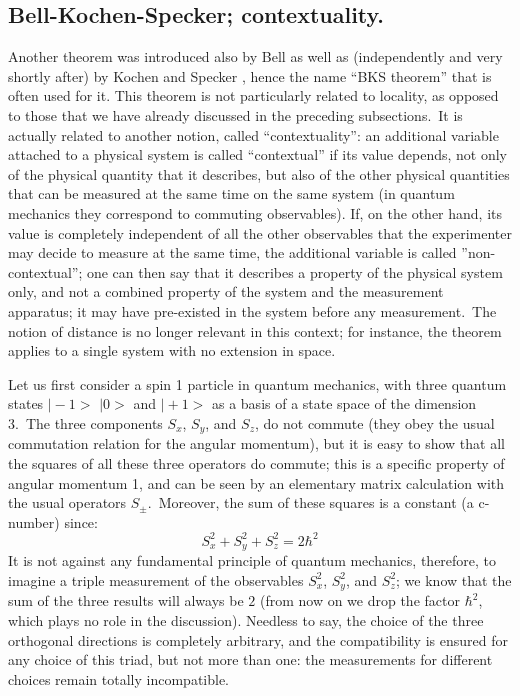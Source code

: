 \documentclass[12pt,onecolumn]{article}%
\begin{document}
\subsection{Bell-Kochen-Specker; contextuality.}

\label{BKS}

Another theorem was introduced also by Bell \cite{Bell-1} as well as
(independently and very shortly after) by Kochen and Specker
\cite{Kochen-Specker}, hence the name ``BKS theorem'' that is often used for
it. This theorem is not particularly related to locality, as opposed to those
that we have already discussed in the preceding subsections.\ It is actually
related to another notion, called ``contextuality'': an additional variable
attached to a physical system is called ``contextual'' if its value depends,
not only of the physical quantity that it describes, but also of the other
physical quantities that can be measured at the same time on the same system
(in quantum mechanics they correspond to commuting observables). If, on the
other hand, its value is completely independent of all the other observables
that the experimenter may decide to measure at the same time, the additional
variable is called ''non-contextual''; one can then say that it describes a
property of the physical system only, and not a combined property of the
system and the measurement apparatus; it may have pre-existed in the system
before any measurement.\ The notion of distance is no longer relevant in this
context; for instance, the theorem applies to a single system with no
extension in space.

Let us first consider a spin 1 particle in quantum mechanics, with three
quantum states $\mid-1>$ $\mid0>$ and $\mid+1>$ as a basis of a state space of
the dimension 3.\ The three components $S_{x}$, $S_{y}$, and $S_{z}$, do not
commute (they obey the usual commutation relation for the angular momentum),
but it is easy to show that all the squares of all these three operators do
commute; this is a specific property of angular momentum 1, and can be seen by
an elementary matrix calculation with the usual operators $S_{\pm}%
$.\ Moreover, the sum of these squares is a constant (a c-number) since:%
\begin{equation}
S_{x}^{2}+S_{y}^{2}+S_{z}^{2}=2\hbar^{2} \label{12}%
\end{equation}
It is not against any fundamental principle of quantum mechanics, therefore,
to imagine a triple measurement of the observables $S_{x}^{2}$, $S_{y}^{2}$,
and $S_{z}^{2}$; we know that the sum of the three results will always be $2$
(from now on we drop the factor $\hbar^{2}$, which plays no role in the
discussion). Needless to say, the choice of the three orthogonal directions is
completely arbitrary, and the compatibility is ensured for any choice of this
triad, but not more than one: the measurements for different choices remain
totally incompatible.
\end{document}
